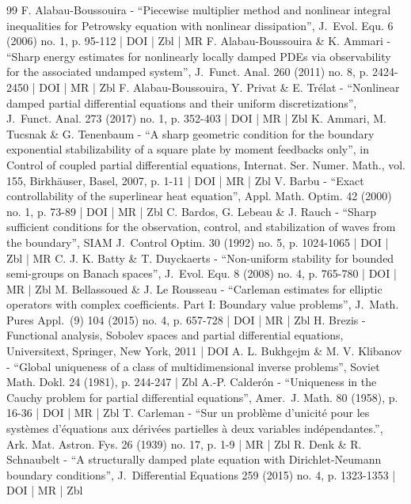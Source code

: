\documentclass[10pt]{amsart}
\theoremstyle{plain}
\theoremstyle{definition}
\begin{document}
\begin{thebibliography}{99}
F. Alabau-Boussouira - “Piecewise multiplier method and nonlinear integral inequalities for Petrowsky equation with nonlinear dissipation”, J. Evol. Equ. 6 (2006) no. 1, p. 95-112 | DOI | Zbl | MR
F. Alabau-Boussouira \& K. Ammari - “Sharp energy estimates for nonlinearly locally damped PDEs via observability for the associated undamped system”, J. Funct. Anal. 260 (2011) no. 8, p. 2424-2450 | DOI | MR | Zbl
F. Alabau-Boussouira, Y. Privat \& E. Trélat - “Nonlinear damped partial differential equations and their uniform discretizations”, J. Funct. Anal. 273 (2017) no. 1, p. 352-403 | DOI | MR | Zbl
K. Ammari, M. Tucsnak \& G. Tenenbaum - “A sharp geometric condition for the boundary exponential stabilizability of a square plate by moment feedbacks only”, in Control of coupled partial differential equations, Internat. Ser. Numer. Math., vol. 155, Birkhäuser, Basel, 2007, p. 1-11 | DOI | MR | Zbl
V. Barbu - “Exact controllability of the superlinear heat equation”, Appl. Math. Optim. 42 (2000) no. 1, p. 73-89 | DOI | MR | Zbl
C. Bardos, G. Lebeau \& J. Rauch - “Sharp sufficient conditions for the observation, control, and stabilization of waves from the boundary”, SIAM J. Control Optim. 30 (1992) no. 5, p. 1024-1065 | DOI | Zbl | MR
C. J. K. Batty \& T. Duyckaerts - “Non-uniform stability for bounded semi-groups on Banach spaces”, J. Evol. Equ. 8 (2008) no. 4, p. 765-780 | DOI | MR | Zbl
M. Bellassoued \& J. Le Rousseau - “Carleman estimates for elliptic operators with complex coefficients. Part I: Boundary value problems”, J. Math. Pures Appl. (9) 104 (2015) no. 4, p. 657-728 | DOI | MR | Zbl
H. Brezis - Functional analysis, Sobolev spaces and partial differential equations, Universitext, Springer, New York, 2011 | DOI
A. L. Bukhgejm \& M. V. Klibanov - “Global uniqueness of a class of multidimensional inverse problems”, Soviet Math. Dokl. 24 (1981), p. 244-247 | Zbl
A.-P. Calderón - “Uniqueness in the Cauchy problem for partial differential equations”, Amer. J. Math. 80 (1958), p. 16-36 | DOI | MR | Zbl
T. Carleman - “Sur un problème d’unicité pour les systèmes d’équations aux dérivées partielles à deux variables indépendantes.”, Ark. Mat. Astron. Fys. 26 (1939) no. 17, p. 1-9 | MR | Zbl
R. Denk \& R. Schnaubelt - “A structurally damped plate equation with Dirichlet-Neumann boundary conditions”, J. Differential Equations 259 (2015) no. 4, p. 1323-1353 | DOI | MR | Zbl

\end{thebibliography}
\end{document}
